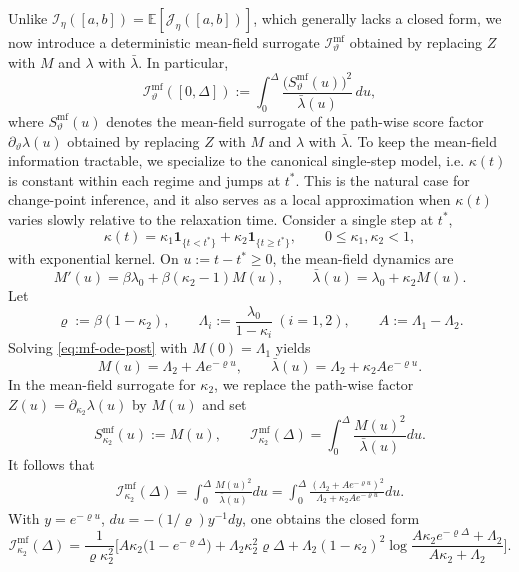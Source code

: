 \documentclass{article}
\theoremstyle{plain}
\theoremstyle{definition}
\newcommand{\E}{\mathbb{E}}
\newcommand{\1}{\mathbf{1}}
\begin{document}
    
    Unlike $\mathcal I_\eta([a,b])=\E[\mathcal J_\eta([a,b])]$, which generally lacks a closed form, we now introduce a deterministic mean-field surrogate $\mathcal I_\vartheta^{\mathrm{mf}}$ obtained by replacing $Z$ with $M$ and $\lambda$ with $\bar\lambda$. In particular,
   \[
\mathcal I_\vartheta^{\mathrm{mf}}([0,\Delta])
:=\int_0^\Delta \frac{\big(S_\vartheta^{\mathrm{mf}}(u)\big)^2}{\bar\lambda(u)}\,du,
\]
    where $S_\vartheta^{\mathrm{mf}}(u)$ denotes the mean-field surrogate of the path-wise score factor $\partial_\vartheta\lambda(u)$ obtained by replacing $Z$ with $M$ and $\lambda$ with $\bar\lambda$. To keep the mean-field information tractable, we specialize to the canonical single-step model, i.e. $\kappa(t)$ is constant within each regime and jumps at $t^\ast$. This is the natural case for change-point inference, and it also serves as a local approximation when $\kappa(t)$ varies slowly relative to the relaxation time. Consider a single step at $t^\ast$,
    \[
    \kappa(t)=\kappa_1 \1_{\{t<t^\ast\}}+\kappa_2 \1_{\{t\ge t^\ast\}},\qquad
    0\le \kappa_1,\kappa_2<1,
    \]
    with exponential kernel. On $u:=t-t^\ast\ge 0$, the mean-field dynamics are
    \begin{equation}
    \label{eq:mf-ode-post}
    M'(u)=\beta\lambda_0+\beta(\kappa_2-1)M(u),\qquad
    \bar\lambda(u)=\lambda_0+\kappa_2 M(u).
    \end{equation}
    Let
    \[
    \varrho:=\beta(1-\kappa_2),\qquad
    \Lambda_i:=\frac{\lambda_0}{1-\kappa_i}\ (i=1,2),\qquad
    A:=\Lambda_1-\Lambda_2.
    \]
    Solving \eqref{eq:mf-ode-post} with $M(0)=\Lambda_1$ yields
    \begin{equation}
    \label{eq:M-post}
    M(u)=\Lambda_2+A e^{-\varrho u},\qquad
    \bar\lambda(u)=\Lambda_2+\kappa_2 A e^{-\varrho u}.
    \end{equation}
    In the mean-field surrogate for $\kappa_2$, we replace the path-wise factor $Z(u)=\partial_{\kappa_2}\lambda(u)$ by $M(u)$ and set
    \[
    S_{\kappa_2}^{\mathrm{mf}}(u):=M(u),\qquad
    \mathcal I_{\kappa_2}^{\mathrm{mf}}(\Delta)=\int_0^\Delta \frac{M(u)^2}{\bar\lambda(u)} du.
    \]
    It follows that 
    \begin{align}
    \label{eq:Ikappa2-mf}
    \mathcal I_{\kappa_2}^{\mathrm{mf}}(\Delta)
    =\int_0^\Delta \frac{M(u)^2}{\bar\lambda(u)} du
    =\int_0^\Delta \frac{(\Lambda_2+A e^{-\varrho u})^2}{\Lambda_2+\kappa_2 A e^{-\varrho u}} du.
    \end{align}
    With $y=e^{-\varrho u}$, $du=-(1/\varrho)y^{-1}dy$, one obtains the closed form
    \begin{equation}
    \label{eq:Ikappa2-mf-closed}
    \mathcal I_{\kappa_2}^{\mathrm{mf}}(\Delta)
    =\frac{1}{\varrho \kappa_2^2}\Big[
    A\kappa_2\big(1-e^{-\varrho \Delta}\big)
    +\Lambda_2 \kappa_2^2 \varrho\Delta
    + \Lambda_2(1-\kappa_2)^2 
    \log \frac{A\kappa_2 e^{-\varrho \Delta}+\Lambda_2}{A\kappa_2+\Lambda_2}
    \Big].
    \end{equation}
    
\end{document}
